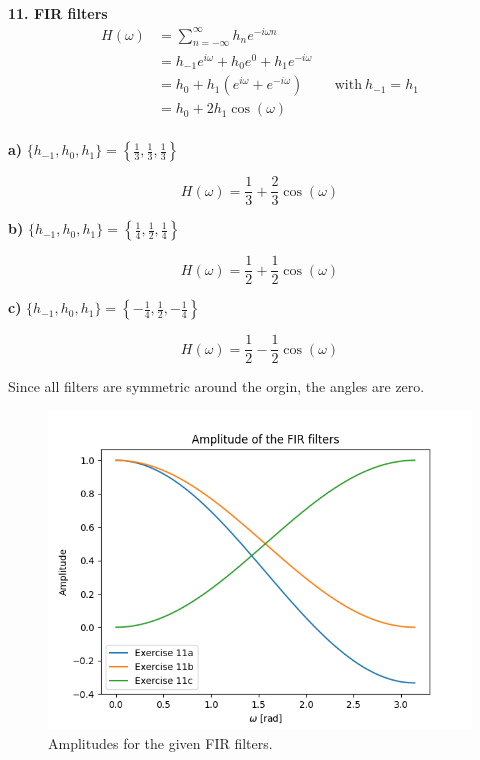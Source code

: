 \textbf{\large 11. FIR filters}
\\

\begin{align}
	H(\omega) &= \sum_{n=-\infty}^\infty h_n e^{-i \omega n} \\
	&= h_{-1} e^{i \omega} + h_0 e^{0} + h_1 e^{-i \omega} \\
	&= h_0 + h_1 \left( e^{i \omega} + e^{-i \omega} \right) & & \text{with}\ h_{-1} = h_1 \\
	&= h_0 + 2 h_1 \cos(\omega) \\
\end{align}


\textbf{a)} $\{h_{-1}, h_0, h_1\} = \left\{\frac{1}{3}, \frac{1}{3}, \frac{1}{3}\right\}$

\begin{equation*}
	H(\omega) = \frac{1}{3} + \frac{2}{3} \cos(\omega)
\end{equation*}

\textbf{b)} $\{h_{-1}, h_0, h_1\} = \left\{\frac{1}{4}, \frac{1}{2}, \frac{1}{4}\right\}$

\begin{equation*}
	H(\omega) = \frac{1}{2} + \frac{1}{2} \cos(\omega)
\end{equation*}

\textbf{c)} $\{h_{-1}, h_0, h_1\} = \left\{-\frac{1}{4}, \frac{1}{2}, -\frac{1}{4}\right\}$

\begin{equation*}
	H(\omega) = \frac{1}{2} - \frac{1}{2} \cos(\omega)
\end{equation*}

\vspace{1cm}
Since all filters are symmetric around the orgin, the angles are zero.

\begin{figure}[h]
	\centering
	\includegraphics[width=12cm]{img/ex_11.png}
	\captionsetup{width=10cm}
	\caption{Amplitudes for the given FIR filters.}
\end{figure}


